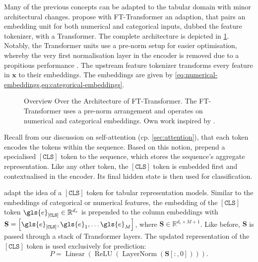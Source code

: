
Many of the previous concepts can be adapted to the tabular domain with minor architectural changes. \textcite[][5]{gorishniyRevisitingDeepLearning2021} propose with FT-Transformer an adaption, that pairs an embedding unit for both numerical and categorical inputs, dubbed the feature tokenizer, with a Transformer. The complete architecture is depicted in \cref{fig:fttransformer}. Notably, the Transformer units use a pre-norm setup for easier optimisation, whereby the very first normalisation layer in the encoder is removed due to a propitious performance \textcite[][17]{gorishniyRevisitingDeepLearning2021}. The upstream feature tokenizer transforms every feature in $\mathbf{x}$ to their embeddings. The embeddings are given by \cref{eq:numerical-embeddings,eq:categorical-embeddings}.

\begin{figure}[ht]
    \centering
    {\renewcommand\normalsize{\scriptsize}
        \normalsize
        }
    \caption[Overview Over the FT-Transformer Architecture]{Overview Over the Architecture of FT-Transformer. The FT-Transformer uses a pre-norm arrangement and operates on numerical and categorical embeddings. Own work inspired by \textcite[][4--5]{gorishniyRevisitingDeepLearning2021}.}
    \label{fig:fttransformer}
\end{figure}

Recall from our discussion on self-attention (cp. \cref{sec:attention}), that each \gls{token} encodes the \glspl{token} within the sequence. Based on this notion, \textcite[][4174]{devlinBERTPretrainingDeep2019} prepend a specialised $\mathtt{[CLS]}$ \gls{token} to the sequence, which stores the sequence's aggregate representation. Like any other \gls{token}, the $\mathtt{[CLS]}$ \gls{token} is embedded first and contextualised in the encoder. Its final hidden state is then used for classification.

\textcite[][4]{gorishniyRevisitingDeepLearning2021} adapt the idea of a $\mathtt{[CLS]}$ \gls{token} for tabular representation models. Similar to the embeddings of categorical or numerical features, the embedding of the $[\mathtt{CLS}]$ \gls{token} $\gls{e}_\mathtt{[CLS]} \in \mathbb{R}^{d_{e}}$ is prepended to the column embeddings with $\mathbf{S} = \left[\gls{e}_\mathtt{[CLS]}, \gls{e}_1, \ldots \gls{e}_{M}\right]$, where $\mathbf{S} \in \mathbb{R}^{d_{e} \times M +1}$. Like before, $\mathbf{S}$ is passed through a stack of Transformer layers. The updated representation of the $\mathtt{[CLS]}$ \gls{token} is used exclusively for prediction:
\begin{equation}
    P=\operatorname{Linear}\left(\operatorname{ReLU}\left(\operatorname{LayerNorm}\left(\mathbf{S}\left[:,0\right]\right)\right)\right).
    \label{eq:bert-ft}
\end{equation}


